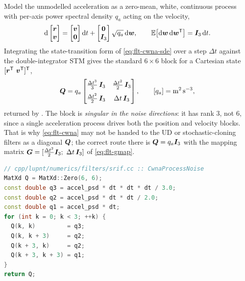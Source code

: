 Model the unmodelled acceleration as a zero-mean, white, continuous process
with per-axis power spectral density $q_a$ acting on the velocity,
\begin{equation}
  \label{eq:flt-cwna-sde}
  \mathrm{d} \begin{bmatrix} \bm{r} \\ \bm{v} \end{bmatrix}
  = \begin{bmatrix} \bm{v} \\ \bm{0} \end{bmatrix} \mathrm{d} t
  + \begin{bmatrix} \bm{0} \\ \bm{I}_3 \end{bmatrix} \sqrt{q_a}\,\mathrm{d} \bm{w},
  \qquad
  \mathbb{E}\bigl[\mathrm{d} \bm{w}\,\mathrm{d} \bm{w}^{\mathsf{T}}\bigr] = \bm{I}_3\,\mathrm{d} t .
\end{equation}
Integrating the state-transition form of \cref{eq:flt-cwna-sde} over a step
$\Delta t$ against the double-integrator STM gives the standard $6\times 6$
block for a Cartesian state $[\vec{r}\transpose\ \vec{v}\transpose]\transpose$,
\begin{equation}
  \label{eq:flt-cwna}
  \bm{Q} = q_a
  \begin{bmatrix}
    \tfrac{\Delta t^3}{3}\,\bm{I}_3 & \tfrac{\Delta t^2}{2}\,\bm{I}_3 \\[6pt]
    \tfrac{\Delta t^2}{2}\,\bm{I}_3 & \Delta t\,\bm{I}_3
  \end{bmatrix},
  \qquad
  [q_a] = \si{\meter\squared\per\second\cubed} ,
\end{equation}
returned by . The block is
\emph{singular in the noise directions}: it has rank 3, not 6, since a single
acceleration process drives both the position and velocity blocks. That is why
\cref{eq:flt-cwna} may not be handed to the UD or stochastic-cloning filters as
a diagonal $\bm{Q}$; the correct route there is
$\bm{Q} = q_a \bm{I}_3$ with the mapping matrix
$\bm{G} = [\tfrac{\Delta t^2}{2}\bm{I}_3;\ \Delta t\,\bm{I}_3]$ of
\cref{eq:flt-gmap}.

\begin{lstlisting}[language=cpp, caption={Continuous white-noise acceleration block.},
                   label={lst:flt-cwna}]
// cpp/lupnt/numerics/filters/srif.cc :: CwnaProcessNoise
MatXd Q = MatXd::Zero(6, 6);
const double q3 = accel_psd * dt * dt * dt / 3.0;
const double q2 = accel_psd * dt * dt / 2.0;
const double q1 = accel_psd * dt;
for (int k = 0; k < 3; ++k) {
  Q(k, k)         = q3;
  Q(k, k + 3)     = q2;
  Q(k + 3, k)     = q2;
  Q(k + 3, k + 3) = q1;
}
return Q;
\end{lstlisting}

